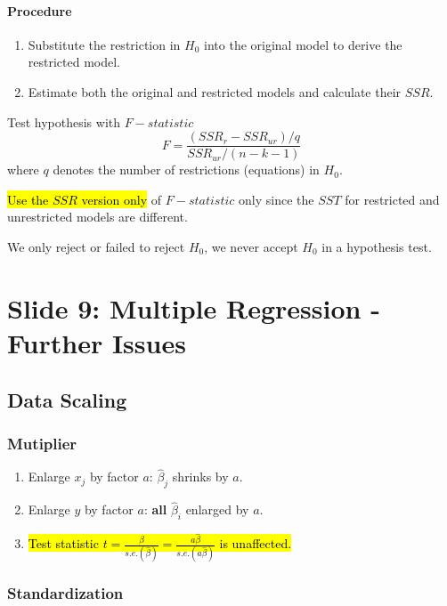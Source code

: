 \documentclass[]{article}
\begin{document}
    	\paragraph{Procedure}
    		\begin{enumerate}
    			\item Substitute the restriction in $H_0$ into the original model to derive the restricted model.
    			\item Estimate both the original and restricted models and calculate their $SSR$.
    		\end{enumerate}
    		Test hypothesis with $F-statistic$
    		\[
    			F = \frac{(SSR_r - SSR_{ur})/q}{SSR_{ur}/(n-k-1)}
    		\]
    		where $q$ denotes the number of restrictions (equations) in $H_0$.
    	\begin{remark}
    		\hl{Use the $SSR$ version only} of $F-statistic$ only since the $SST$ for restricted and unrestricted models are different.
    	\end{remark}
    	\begin{remark}
    		We only reject or failed to reject $H_0$, we never accept $H_0$ in a hypothesis test.
    	\end{remark}
    	
    \section{Slide 9: Multiple Regression - Further Issues}
    	\subsection{Data Scaling}
    		\subsubsection{Mutiplier}
    		\begin{enumerate}
    			\item Enlarge $x_j$ by factor $a$: $\hat{\beta}_j$ shrinks by $a$.
    			\item Enlarge $y$ by factor $a$: \textbf{all} $\hat{\beta}_i$ enlarged by $a$.
    			\item \hl{Test statistic $t = \frac{\hat{\beta}}{s.e.(\hat{\beta})} = \frac{a\hat{\beta}}{s.e.(a \hat{\beta})}$ is unaffected.}
    		\end{enumerate}
    	
    		\subsubsection{Standardization}
\end{document}
